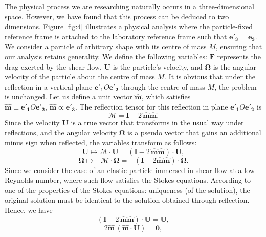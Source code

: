 \documentclass[12pt,MSc,twoside]{muthesis_2020}
\begin{document}
The physical process we are researching naturally occurs in a three-dimensional space. However, we have found that this process can be deduced to two dimensions. Figure \ref{fig:4} illustrates a physical analysis where the particle-fixed reference frame is attached to the laboratory reference frame such that $\mathbf{e'_3}=\mathbf{e_3}$. We consider a particle of arbitrary shape with its centre of mass $M$, ensuring that our analysis retains generality. We define the following variables: $\mathbf{F}$ represents the drag exerted by the shear flow, $\mathbf{U}$ is the particle's velocity, and $\mathbf{\Omega}$ is the angular velocity of the particle about the centre of mass $M$. It is obvious that under the reflection in a vertical plane $\mathbf{e'_1}O\mathbf{e'_2}$ through the centre of mass $M$, the problem is unchanged. Let us define a unit vector $\mathbf{\hat{m}}$, which satisfies $\mathbf{\hat{m}} \perp \mathbf{e'_1}O\mathbf{e'_2},\, \mathbf{\hat{m}}\varpropto \mathbf{e'_3}$. The reflection tensor for this reflection in plane $\mathbf{e'_1}O\mathbf{e'_2}$ is
\begin{equation}
	\label{eqn:2}
	\mathbf{\mathcal{M}}=\mathbf{I}-2\,\mathbf{\hat{m}}\mathbf{\hat{m}}.
\end{equation}
Since the velocity $\mathbf{U}$ is a true vector that transforms in the usual way under reflections, and the angular velocity $\mathbf{\Omega}$ is a pseudo vector that gains an additional minus sign when reflected, the variables transform as follows:
\begin{equation}
	\label{eqn:3}
	\mathbf{U}\mapsto\mathbf{\mathcal{M}}\cdot\mathbf{U}=(\mathbf{I}-2\,\mathbf{\hat{m}}\mathbf{\hat{m}})\cdot\mathbf{U},
\end{equation}
\begin{equation}
	\label{eqn:4}
	\mathbf{\Omega}\mapsto-\mathbf{\mathcal{M}}\cdot\mathbf{\Omega}=-(\mathbf{I}-2\mathbf{\hat{m}}\mathbf{\hat{m}})\cdot\mathbf{\Omega}.
\end{equation}
Since we consider the case of an elastic particle immersed in shear flow at a low Reynolds number, where such flow satisfies the Stokes equations. According to one of the properties of the Stokes equations: uniqueness (of the solution), the original solution must be identical to the solution obtained through reflection. Hence, we have
\begin{equation}
	\label{eqn:5}
	(\mathbf{I}-2\,\mathbf{\hat{m}}\mathbf{\hat{m}})\cdot\mathbf{U}=\mathbf{U},
\end{equation}
\begin{equation}
	\label{eqn:6}
	2\mathbf{\hat{m}}\,(\mathbf{\hat{m}}\cdot\mathbf{U})=\mathbf{0},
\end{equation}
\end{document}
